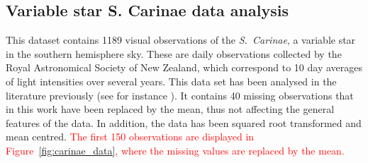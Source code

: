 \documentclass[twocolumn,final]{svjour3}
\begin{document}

\subsection{Variable star S. Carinae data analysis}

This dataset contains 1189 visual observations of the {\it S.\ Carinae}, a variable star in the southern hemisphere sky.  These are daily observations collected by the Royal Astronomical Society of New Zealand, which correspond to 10 day averages of light intensities over several years.  This data set has been analysed in the literature previously (see for instance \cite{Cart:1997,Huerta:1999,Kirch:2018}).  It contains 40 missing observations that in this work have been replaced by the mean, thus not affecting the general features of the data.  In addition, the data has been squared root transformed and mean centred.  \textcolor{red}{ The first 150 observations are displayed in Figure~\ref{fig:carinae_data}, where the missing values are replaced by the mean.}  
\end{document}
